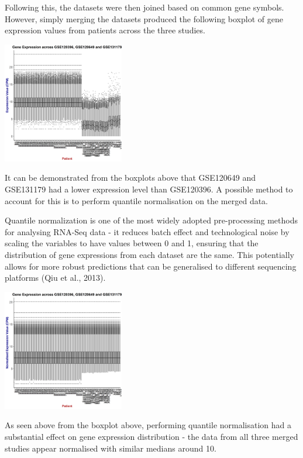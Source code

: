 \documentclass[a4paper,9pt,twocolumn,twoside,]{pinp}
\begin{document}
Following this, the datasets were then joined based on common gene
symbols. However, simply merging the datasets produced the following
boxplot of gene expression values from patients across the three
studies.

\begin{center}\includegraphics[width=200px]{images/part1merged} \end{center}

It can be demonstrated from the boxplots above that GSE120649 and
GSE131179 had a lower expression level than GSE120396. A possible method
to account for this is to perform quantile normalisation on the merged
data.

Quantile normalization is one of the most widely adopted pre-processing
methods for analysing RNA-Seq data - it reduces batch effect and
technological noise by scaling the variables to have values between 0
and 1, ensuring that the distribution of gene expressions from each
dataset are the same. This potentially allows for more robust
predictions that can be generalised to different sequencing platforms
(Qiu et al., 2013).

\begin{center}\includegraphics[width=200px]{images/part1merged_norm} \end{center}

As seen above from the boxplot above, performing quantile normalisation
had a substantial effect on gene expression distribution - the data from
all three merged studies appear normalised with similar medians around
10.
\end{document}
